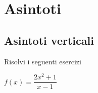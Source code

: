 \chapter{Asintoti}
\section{Asintoti verticali}
Risolvi i seguenti esercizi
\tcbstartrecording


\begin{exercise}[no solution]
	$f(x)= \dfrac{2x^2+1}{x-1}$
\end{exercise}
